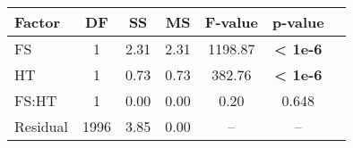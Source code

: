 \begin{table}[ht!]
\begin{minipage}{\textwidth}
    \begin{tabular}{lcccccc}
    \toprule
    \textbf{Factor} & \textbf{DF} & \textbf{SS}    & \textbf{MS}    & \textbf{F-value}    & \textbf{p-value}  \\
    \midrule
    FS        & 1   & 2.31  & 2.31   & 1198.87 & \textbf{< 1e-6} \\
    HT        & 1   & 0.73  & 0.73   & 382.76  & \textbf{< 1e-6} \\
    FS:HT     & 1   & 0.00  & 0.00   & 0.20    & 0.648   \\
    Residual  & 1996 & 3.85  & 0.00   & --          & --              \\
    \bottomrule
    \end{tabular}
    \end{minipage}
\end{table}

